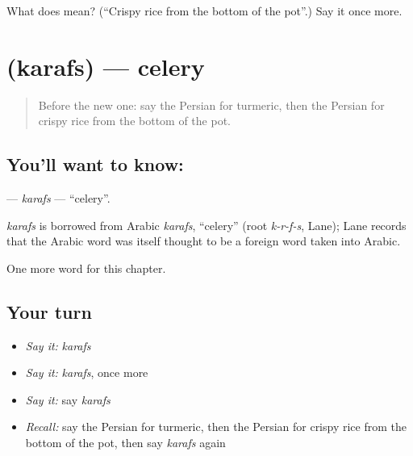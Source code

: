 \begin{tcolorbox}[breakable,colback=teal!4,colframe=teal!35!black,title={Before you move on}]
What does   mean? (\textquotedblleft{}Crispy rice from the bottom of the pot\textquotedblright{}.) Say it once more.
\end{tcolorbox}
\section[\texorpdfstring{\fa{کرفس} (karafs)}{کرفس (karafs)}]{ (karafs) — celery}

\label{lesson:FA-C249-karafs}



\begin{quote}
Before the new one: say the Persian for turmeric, then the Persian for crispy rice from the bottom of the pot.
\end{quote}

\subsection*{You'll want to know: }
\textbf{} — \emph{karafs} — \textquotedblleft{}celery\textquotedblright{}.

\begin{cousinweb}
\emph{karafs} is borrowed from Arabic \emph{karafs}, \textquotedblleft{}celery\textquotedblright{} (root \emph{k-r-f-s}, Lane); Lane records that the Arabic word was itself thought to be a foreign word taken into Arabic.
\end{cousinweb}

\begin{grammarlens}[title={What you've built}]
One more word for this chapter.
\end{grammarlens}

\subsection*{Your turn}
\begin{itemize}
\raggedright
  \item \emph{Say it:} \emph{karafs}
  \item \emph{Say it:} \emph{karafs}, once more
  \item \emph{Say it:} say \emph{karafs}
  \item \emph{Recall:} say the Persian for turmeric, then the Persian for crispy rice from the bottom of the pot, then say \emph{karafs} again
\end{itemize}

